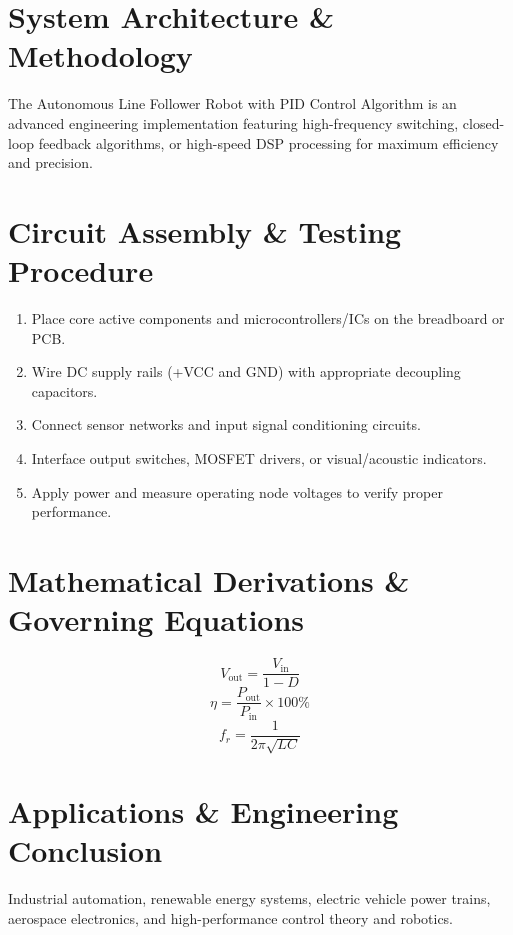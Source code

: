 \documentclass[11pt,a4paper]{article}
\begin{document}
\section{System Architecture \& Methodology}
The Autonomous Line Follower Robot with PID Control Algorithm is an advanced engineering implementation featuring high-frequency switching, closed-loop feedback algorithms, or high-speed DSP processing for maximum efficiency and precision.

\section{Circuit Assembly \& Testing Procedure}
\begin{enumerate}
    \item Place core active components and microcontrollers/ICs on the breadboard or PCB.
    \item Wire DC supply rails (+VCC and GND) with appropriate decoupling capacitors.
    \item Connect sensor networks and input signal conditioning circuits.
    \item Interface output switches, MOSFET drivers, or visual/acoustic indicators.
    \item Apply power and measure operating node voltages to verify proper performance.
\end{enumerate}

\section{Mathematical Derivations \& Governing Equations}
\begin{equation}
V_{\text{out}} = \frac{V_{\text{in}}}{1 - D}
\end{equation}
\begin{equation}
\eta = \frac{P_{\text{out}}}{P_{\text{in}}} \times 100\%
\end{equation}
\begin{equation}
f_r = \frac{1}{2\pi \sqrt{L C}}
\end{equation}

\section{Applications \& Engineering Conclusion}
Industrial automation, renewable energy systems, electric vehicle power trains, aerospace electronics, and high-performance control theory and robotics.
\end{document}
